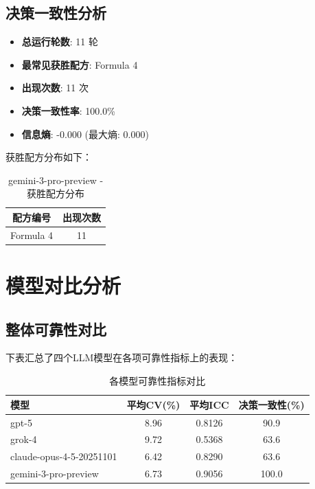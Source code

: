 \documentclass[12pt,a4paper]{article}
\begin{document}
\subsection{决策一致性分析}


\begin{itemize}
    \item \textbf{总运行轮数}: 11 轮
    \item \textbf{最常见获胜配方}: Formula 4
    \item \textbf{出现次数}: 11 次
    \item \textbf{决策一致性率}: 100.0\%
    \item \textbf{信息熵}: -0.000 (最大熵: 0.000)
\end{itemize}

获胜配方分布如下：

\begin{table}[H]
\centering
\caption{gemini-3-pro-preview - 获胜配方分布}
\begin{tabular}{cc}
\toprule
\textbf{配方编号} & \textbf{出现次数} \\
\midrule
Formula 4 & 11 \\
\bottomrule
\end{tabular}
\end{table}


\newpage


\section{模型对比分析}

\subsection{整体可靠性对比}

下表汇总了四个LLM模型在各项可靠性指标上的表现：

\begin{table}[H]
\centering
\caption{各模型可靠性指标对比}
\begin{tabular}{lccc}
\toprule
\textbf{模型} & \textbf{平均CV(\%)} & \textbf{平均ICC} & \textbf{决策一致性(\%)} \\
\midrule
gpt-5 & 8.96 & 0.8126 & 90.9 \\
grok-4 & 9.72 & 0.5368 & 63.6 \\
claude-opus-4-5-20251101 & 6.42 & 0.8290 & 63.6 \\
gemini-3-pro-preview & 6.73 & 0.9056 & 100.0 \\
\bottomrule
\end{tabular}
\end{table}
\end{document}
